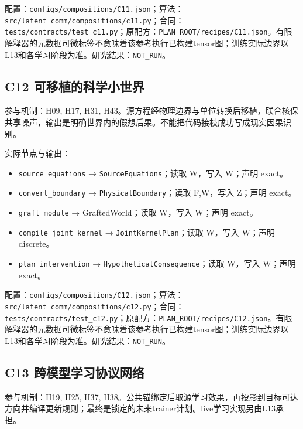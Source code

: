 \documentclass[
  10pt,
]{article}
\begin{document}
配置：{\small\nolinkurl{configs/compositions/C11.json}}；算法：{\small\nolinkurl{src/latent_comm/compositions/c11.py}}；合同：{\small\nolinkurl{tests/contracts/test_c11.py}}；原配方：{\small\nolinkurl{PLAN_ROOT/recipes/C11.json}}。有限解释器的元数据可微标签不意味着该参考执行已构建tensor图；训练实际边界以L13和各学习阶段为准。研究结果：\nolinkurl{NOT_RUN}。

\subsection{C12
可移植的科学小世界}\label{c12-ux53efux79fbux690dux7684ux79d1ux5b66ux5c0fux4e16ux754c}

参与机制：H09, H17, H31,
H43。源方程经物理边界与单位转换后移植，联合核保共享噪声，输出是明确世界内的假想后果。不能把代码接枝成功写成现实因果识别。

实际节点与输出：

\begin{itemize}
\item
  \nolinkurl{source_equations} → \nolinkurl{SourceEquations}；读取
  W，写入 W；声明 exact。
\item
  \nolinkurl{convert_boundary} → \nolinkurl{PhysicalBoundary}；读取
  F,W，写入 Z；声明 exact。
\item
  \nolinkurl{graft_module} → GraftedWorld；读取 W，写入 W；声明 exact。
\item
  \nolinkurl{compile_joint_kernel} → \nolinkurl{JointKernelPlan}；读取
  W，写入 W；声明 discrete。
\item
  \nolinkurl{plan_intervention} →
  \nolinkurl{HypotheticalConsequence}；读取 W，写入 W；声明 exact。
\end{itemize}

配置：{\small\nolinkurl{configs/compositions/C12.json}}；算法：{\small\nolinkurl{src/latent_comm/compositions/c12.py}}；合同：{\small\nolinkurl{tests/contracts/test_c12.py}}；原配方：{\small\nolinkurl{PLAN_ROOT/recipes/C12.json}}。有限解释器的元数据可微标签不意味着该参考执行已构建tensor图；训练实际边界以L13和各学习阶段为准。研究结果：\nolinkurl{NOT_RUN}。

\subsection{C13
跨模型学习协议网络}\label{c13-ux8de8ux6a21ux578bux5b66ux4e60ux534fux8baeux7f51ux7edc}

参与机制：H19, H25, H37,
H38。公共锚绑定后取源学习效果，再投影到目标可达方向并编译更新规则；最终是锁定的未来trainer计划。live学习实现另由L13承担。
\end{document}
